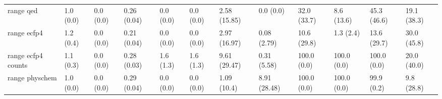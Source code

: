 \begin{tabular}{llllllllllll}
range qed & {\cellcolor[HTML]{F6FCFD}} \color[HTML]{000000} 1.0 (0.0) & {\cellcolor[HTML]{F7FCFD}} \color[HTML]{000000} 0.0 (0.0) & {\cellcolor[HTML]{45B07B}} \color[HTML]{F1F1F1} 0.26 (0.04) & {\cellcolor[HTML]{F7FCFD}} \color[HTML]{000000} 0.0 (0.0) & {\cellcolor[HTML]{F7FCFD}} \color[HTML]{000000} 0.0 (0.0) & {\cellcolor[HTML]{F4FBFC}} \color[HTML]{000000} 2.58 (15.85) & {\cellcolor[HTML]{F7FCFD}} \color[HTML]{000000} 0.0 (0.0) & {\cellcolor[HTML]{CDECE7}} \color[HTML]{000000} 32.0 (33.7) & {\cellcolor[HTML]{88D1BD}} \color[HTML]{000000} 8.6 (13.6) & {\cellcolor[HTML]{60BF9C}} \color[HTML]{000000} 45.3 (46.6) & {\cellcolor[HTML]{F7FCFD}} \color[HTML]{000000} 19.1 (38.3) \\
range ecfp4 & {\cellcolor[HTML]{F5FBFD}} \color[HTML]{000000} 1.2 (0.4) & {\cellcolor[HTML]{F7FCFD}} \color[HTML]{000000} 0.0 (0.0) & {\cellcolor[HTML]{4DB585}} \color[HTML]{F1F1F1} 0.21 (0.04) & {\cellcolor[HTML]{F7FCFD}} \color[HTML]{000000} 0.0 (0.0) & {\cellcolor[HTML]{F7FCFD}} \color[HTML]{000000} 0.0 (0.0) & {\cellcolor[HTML]{F3FAFC}} \color[HTML]{000000} 2.97 (16.97) & {\cellcolor[HTML]{F7FCFD}} \color[HTML]{000000} 0.08 (2.79) & {\cellcolor[HTML]{D1EEE9}} \color[HTML]{000000} 10.6 (29.8) & {\cellcolor[HTML]{E2F4F7}} \color[HTML]{000000} 1.3 (2.4) & {\cellcolor[HTML]{2A9350}} \color[HTML]{F1F1F1} 13.6 (29.7) & {\cellcolor[HTML]{48B27F}} \color[HTML]{F1F1F1} 30.0 (45.8) \\
range ecfp4 counts & {\cellcolor[HTML]{F6FCFD}} \color[HTML]{000000} 1.1 (0.3) & {\cellcolor[HTML]{F7FCFD}} \color[HTML]{000000} 0.0 (0.0) & {\cellcolor[HTML]{4DB585}} \color[HTML]{F1F1F1} 0.28 (0.03) & {\cellcolor[HTML]{F7FCFD}} \color[HTML]{000000} 1.6 (1.3) & {\cellcolor[HTML]{F7FCFD}} \color[HTML]{000000} 1.6 (1.3) & {\cellcolor[HTML]{E9F7FA}} \color[HTML]{000000} 9.61 (29.47) & {\cellcolor[HTML]{F7FCFD}} \color[HTML]{000000} 0.31 (5.58) & {\cellcolor[HTML]{8FD4C2}} \color[HTML]{000000} 100.0 (0.0) & {\cellcolor[HTML]{74C8AE}} \color[HTML]{000000} 100.0 (0.0) & {\cellcolor[HTML]{00441B}} \color[HTML]{F1F1F1} 100.0 (0.0) & {\cellcolor[HTML]{329D5E}} \color[HTML]{F1F1F1} 20.0 (40.0) \\
range physchem & {\cellcolor[HTML]{F6FCFD}} \color[HTML]{000000} 1.0 (0.0) & {\cellcolor[HTML]{F7FCFD}} \color[HTML]{000000} 0.0 (0.0) & {\cellcolor[HTML]{60BF9C}} \color[HTML]{000000} 0.29 (0.04) & {\cellcolor[HTML]{F7FCFD}} \color[HTML]{000000} 0.0 (0.0) & {\cellcolor[HTML]{F7FCFD}} \color[HTML]{000000} 0.0 (0.0) & {\cellcolor[HTML]{F6FCFD}} \color[HTML]{000000} 1.09 (10.4) & {\cellcolor[HTML]{EBF7FA}} \color[HTML]{000000} 8.91 (28.48) & {\cellcolor[HTML]{00441B}} \color[HTML]{F1F1F1} 100.0 (0.0) & {\cellcolor[HTML]{00441B}} \color[HTML]{F1F1F1} 100.0 (0.0) & {\cellcolor[HTML]{005924}} \color[HTML]{F1F1F1} 99.9 (0.2) & {\cellcolor[HTML]{C0E7DF}} \color[HTML]{000000} 9.8 (28.8) \\

\end{tabular}
